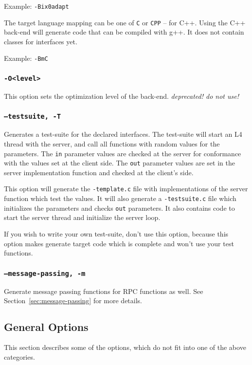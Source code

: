 Example: \verb|-Bix0adapt|

The target language mapping can be one of {\tt C} or {\tt CPP} -- for C++.
Using the C++ back-end will generate code that can be compiled with g++. It
does not contain classes for interfaces yet.

Example: \verb|-BmC|

\subsubsection{{\tt -O<level>}}
This option sets the optimization level of the back-end.
\emph{deprecated! do not use!}

\subsubsection{{\tt --testsuite, -T}}
Generates a test-suite for the declared interfaces. The test-suite
will start an L4 thread with the server, and call all functions
with random values for the parameters. The \verb|in| parameter
values are checked at the server for conformance with the values
set at the client side. The \verb|out| parameter values are set
in the server implementation function and checked at the client's
side.

This option will generate the \verb|-template.c| file with 
implementations of the server function which test the values.
It will also generate a \verb|-testsuite.c| file which initializes
the parameters and checks \verb|out| parameters. It also contains
code to start the server thread and initialize the server loop.

If you wish to write your own test-suite, don't use this
option, because this option makes \dice{} generate target
code which is complete and won't use your test functions.


\subsubsection{{\tt --message-passing, -m}}
Generate message passing functions for RPC functions as well.
See Section~\ref{sec:message-passing} for more details.

\subsection{General Options}
This section describes some of the options, which do not fit into one 
of the above categories.

